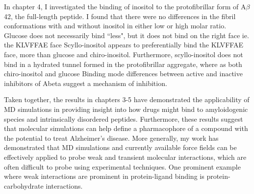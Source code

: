 In chapter 4, I investigated the binding of inositol to the protofibrillar form of A$\beta$42, the full-length peptide. I found that there were no differences in the fibril conformations with and without inositol in either low or high molar ratio.
Glucose does not necessarily bind ``less", but it does not bind on the right face ie. the KLVFFAE face Scyllo-inositol appears to preferentially bind the KLVFFAE face, more than glucose and chiro-inositol.  Furthermore, scyllo-inositol does not bind in a hydrated tunnel formed in the protofibrillar aggregate, where as both chiro-inositol and glucose Binding mode differences between active and inactive inhibitors of Abeta suggest a mechanism of inhibition.

Taken together, the results in chapters 3-5 have demonstrated the applicability of MD simulations in providing insight into how drugs might bind to amyloidogenic species and intrinsically disordered peptides.  Furthermore, these results suggest that molecular simulations can help define a pharmacophore of a compound with the potential to treat Alzheimer's disease. 
More generally, my work has demonstrated that MD simulations and currently available force fields can be effectively applied to probe weak and transient molecular interactions, which are often difficult to probe using experimental techniques. One prominent example where weak interactions are prominent in protein-ligand binding is protein-carbohydrate interactions.\cite{weak binding review paper}

